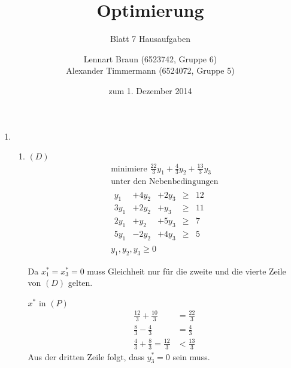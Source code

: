 \documentclass[a4paper]{scrartcl}
\title{Optimierung}
\subtitle{Blatt 7 Hausaufgaben}
\author{
	Lennart Braun (6523742, Gruppe 6) \\
    Alexander Timmermann (6524072, Gruppe 5)
}
\date{zum 1. Dezember 2014}
\begin{document}
\maketitle

\begin{enumerate}[label=\bfseries\arabic*.]
    \item %
        \begin{enumerate}
            \item $(D)$
                \begin{equation}
                    \begin{gathered}
                        \text{minimiere }
                        \frac{22}{3}y_1 + \frac{4}{3}y_2 + \frac{13}{3}y_3 \\
                        \text{unter den Nebenbedingungen} \\
                        \begin{array}{rrrcr}
                            y_1 & + 4y_2 & +2y_3 & \geq & 12 \\
                            3y_1 & +2y_2 & +y_3 & \geq & 11 \\
                            2y_1 & +y_2 & +5y_3 & \geq & 7 \\
                            5y_1 & -2y_2 & +4y_3 & \geq & 5
                        \end{array} \\
                        y_1, y_2, y_3 \geq 0
                    \end{gathered}
                \end{equation}

                Da $x_1^* = x_3^* = 0$ muss Gleichheit nur für die zweite und
                die vierte Zeile von $(D)$ gelten.

                $x^*$ in $(P)$
                \begin{equation}
                    \begin{split}
                        \frac{12}{3} + \frac{10}{3} &= \frac{22}{3} \\
                        \frac{8}{3} - \frac{4}{3} &= \frac{4}{3} \\
                        \frac{4}{3} + \frac{8}{3} = \frac{12}{3} &< \frac{13}{3}
                    \end{split}
                \end{equation}
                Aus der dritten Zeile folgt, dass $y_3^* = 0$ sein muss.


\end{enumerate}
\end{enumerate}
\end{document}
